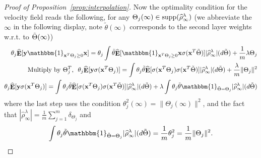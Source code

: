 \documentclass[11pt]{article}
\numberwithin{equation}{section}
\def\E{\mathop{\mathbf{E}}}
\def\bd#1{\mathbf{#1}}
\def\bx{\bd{x}}
\def\by{\bd{y}}
\begin{document}
\begin{proof}[Proof of Proposition~\ref{prop:interpolation}]
Now the optimality condition for the velocity field reads the following, for any $\Theta_j(\infty) \in {\rm supp}(\widehat{\rho}_\infty^{\lambda})$ (we abbreviate the $\infty$ in the following display, note $\tilde{\theta}(\infty)$ corresponds to the second layer weights w.r.t. to $\Tilde{\Theta}(\infty)$)
\begin{align*}
    \theta_j \widehat{\E}[\by \mathbbm{1}_{\bx^T\Theta_{j}\geq0}\bx] = \theta_j \int \tilde{\theta} \widehat{\E}[\mathbbm{1}_{\bx^T\Theta_{j}\geq0}\bx \sigma(\bx^T \tilde{\Theta}) ] |\widehat{\rho}_\infty^{\lambda}|(d \tilde{\Theta}) + \frac{1}{m}\lambda \Theta_j \\
    \text{Multiply by $\Theta_j^T$,} ~~ \theta_j \widehat{\E}[\by \sigma(\bx^T \Theta_{j})] = \int \theta_j \tilde{\theta} \widehat{\E}[ \sigma(\bx^T \Theta_{j}) \sigma(\bx^T \tilde{\Theta}) ] |\widehat{\rho}_\infty^{\lambda}|(d \tilde{\Theta}) + \frac{\lambda}{m} \| \Theta_j \|^2 \\
    \theta_j  \widehat{\E}[\by \sigma(\bx^T \Theta_{j})] = \int \theta_j \tilde{\theta} \widehat{\E}[ \sigma(\bx^T \Theta_{j}) \sigma(\bx^T \tilde{\Theta}) ] |\widehat{\rho}_\infty^{\lambda}|(d \tilde{\Theta}) + \lambda  \int \theta_j \tilde{\theta} \mathbbm{1}_{\tilde{\Theta} = \Theta_j}  |\widehat{\rho}_\infty^{\lambda}|(d \tilde{\Theta})
\end{align*}
where the last step uses the condition $\theta_j^2(\infty) = \| \Theta_j(\infty) \|^2$, and the fact that $|\widehat{\rho}_\infty^{\lambda}| = \frac{1}{m} \sum_{j=1}^m \delta_{\Theta_j}$ and
\begin{align*}
    \int \theta_j \tilde{\theta} \mathbbm{1}_{\tilde{\Theta} = \Theta_j}  |\widehat{\rho}_\infty^{\lambda}|(d \tilde{\Theta}) = \frac{1}{m} \theta_j^2 = \frac{1}{m} \| \Theta_j \|^2.
\end{align*}


\end{proof}
\end{document}
